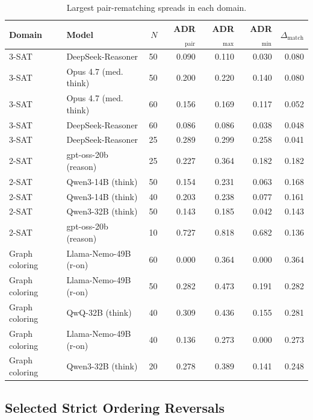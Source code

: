 \documentclass[acmsmall,screen,review,anonymous]{acmart}
\begin{document}
\begin{table}[t]
\centering
\caption{Largest pair-rematching spreads in each domain.}
\label{tab:supp-pair-top}
\renewcommand{\arraystretch}{1.06}
\begin{tabular}{llrrrrr}
\toprule
Domain & Model & $N$ & ADR$_{\mathrm{pair}}$ & ADR$_{\max}$ & ADR$_{\min}$ & $\Delta_{\mathrm{match}}$\\
\midrule
3-SAT & DeepSeek-Reasoner & 50 & 0.090 & 0.110 & 0.030 & 0.080 \\
3-SAT & Opus 4.7 (med. think) & 50 & 0.200 & 0.220 & 0.140 & 0.080 \\
3-SAT & Opus 4.7 (med. think) & 60 & 0.156 & 0.169 & 0.117 & 0.052 \\
3-SAT & DeepSeek-Reasoner & 60 & 0.086 & 0.086 & 0.038 & 0.048 \\
3-SAT & DeepSeek-Reasoner & 25 & 0.289 & 0.299 & 0.258 & 0.041 \\
\midrule
2-SAT & gpt-oss-20b (reason) & 25 & 0.227 & 0.364 & 0.182 & 0.182 \\
2-SAT & Qwen3-14B (think) & 50 & 0.154 & 0.231 & 0.063 & 0.168 \\
2-SAT & Qwen3-14B (think) & 40 & 0.203 & 0.238 & 0.077 & 0.161 \\
2-SAT & Qwen3-32B (think) & 50 & 0.143 & 0.185 & 0.042 & 0.143 \\
2-SAT & gpt-oss-20b (reason) & 10 & 0.727 & 0.818 & 0.682 & 0.136 \\
\midrule
Graph coloring & Llama-Nemo-49B (r-on) & 60 & 0.000 & 0.364 & 0.000 & 0.364 \\
Graph coloring & Llama-Nemo-49B (r-on) & 50 & 0.282 & 0.473 & 0.191 & 0.282 \\
Graph coloring & QwQ-32B (think) & 40 & 0.309 & 0.436 & 0.155 & 0.281 \\
Graph coloring & Llama-Nemo-49B (r-on) & 40 & 0.136 & 0.273 & 0.000 & 0.273 \\
Graph coloring & Qwen3-32B (think) & 20 & 0.278 & 0.389 & 0.141 & 0.248 \\
\bottomrule
\end{tabular}
\end{table}

\subsection{Selected Strict Ordering Reversals}
\end{document}
